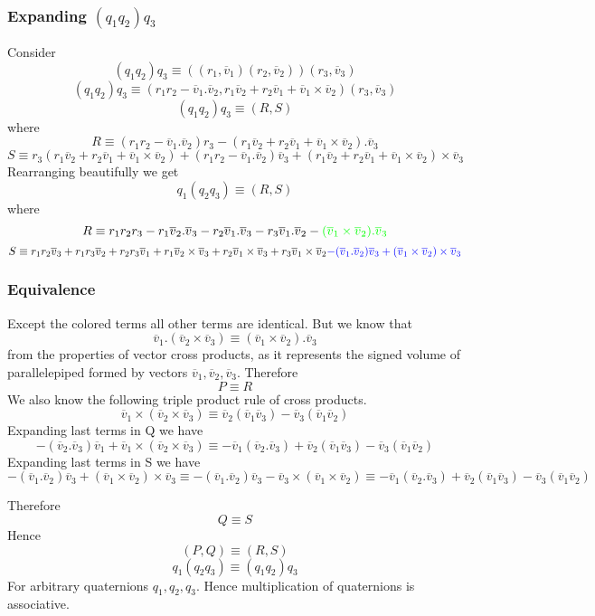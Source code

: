 \documentclass[12pt]{article}
\newcommand{\vv}[1]{\overline{v}_{#1}}
\begin{document}
\subsubsection*{Expanding $(q_1q_2)q_3$}
Consider
\[
  (q_1q_2)q_3 \equiv ((r_1, \vv{1})(r_2, \vv{2}))(r_3, \vv{3})
\]
\[
  (q_1q_2)q_3 \equiv (r_1r_2 - \vv{1}.\vv{2}, r_1 \vv{2} + r_2 \vv{1} + \vv{1}\times\vv{2}) (r_3, \vv{3})
\]
\[
  (q_1q_2)q_3 \equiv (R, S)
\]
where
\[
  R \equiv (r_1r_2 - \vv{1}.\vv{2})r_3 - (r_1 \vv{2} + r_2 \vv{1} + \vv{1}\times\vv{2}).\vv{3}
\]
\[
  S \equiv
    r_3(r_1 \vv{2} + r_2 \vv{1} + \vv{1}\times\vv{2})
    + (r_1r_2 - \vv{1}.\vv{2})\vv{3}
    + (r_1 \vv{2} + r_2 \vv{1} + \vv{1}\times\vv{2}) \times \vv{3}
\]
Rearranging beautifully we get
\[
  q_1(q_2q_3) \equiv (R, S)
\]
where
\[
  R \equiv r_1r_2r_3 - r_1\vv{2}.\vv{3} - r_2\vv{1}.\vv{3} - r_3\vv{1}.\vv{2} - {\color{green} (\vv{1}\times\vv{2}).\vv{3}}
\]
\[
  S \equiv
  r_1r_2\vv{3}
  + r_1r_3\vv{2}
  + r_2r_3\vv{1}
  + r_1 \vv{2}\times\vv{3}
  + r_2 \vv{1}\times\vv{3}
  + r_3 \vv{1}\times\vv{2}
  {\color{blue}
  - (\vv{1}.\vv{2})\vv{3}
  + (\vv{1}\times\vv{2})\times\vv{3}}
\]

\subsubsection*{Equivalence}
Except the colored terms all other terms are identical.
But we know that
\[
  \vv{1}.(\vv{2}\times\vv{3}) \equiv (\vv{1}\times\vv{2}).\vv{3}
\]
from the properties of vector cross products, as it represents the signed volume of parallelepiped formed by vectors $\vv{1}, \vv{2}, \vv{3}$.
Therefore
\[
P \equiv R
\]
We also know the following triple product rule of cross products.
\[
  \vv{1} \times (\vv{2}\times\vv{3})
  \equiv
  \vv{2} (\vv{1}\vv{3})
  - \vv{3} (\vv{1}\vv{2})
\]
Expanding last terms in Q we have
\[
  - (\vv{2}.\vv{3})\vv{1}
  + \vv{1} \times (\vv{2}\times\vv{3})
  \equiv
  - \vv{1} (\vv{2}.\vv{3})
  + \vv{2} (\vv{1}\vv{3})
  - \vv{3} (\vv{1}\vv{2})

\]
Expanding last terms in S we have
\[
  - (\vv{1}.\vv{2})\vv{3}
  + (\vv{1}\times\vv{2})\times\vv{3}
  \equiv
  - (\vv{1}.\vv{2})\vv{3}
  - \vv{3}\times(\vv{1}\times\vv{2})
  \equiv
  - \vv{1} (\vv{2}.\vv{3})
  + \vv{2} (\vv{1}\vv{3})
  - \vv{3} (\vv{1}\vv{2})
\]

Therefore
\[
Q \equiv S
\]
Hence
\[
  (P, Q) \equiv (R, S)
\]
\[
  q_1(q_2q_3) \equiv (q_1q_2)q_3
\]
For arbitrary quaternions $q_1, q_2, q_3$. Hence multiplication of quaternions is associative.
\end{document}
